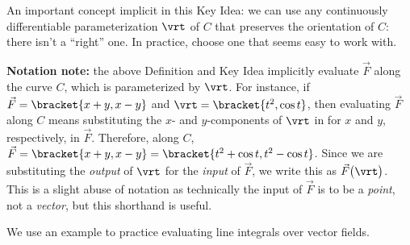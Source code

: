 An important concept implicit in this Key Idea: we can use any continuously differentiable parameterization $\vrt$ of $C$ that preserves the orientation of $C$: there isn't a ``right'' one. In practice, choose one that seems easy to work with. 

\textbf{Notation note:} the above Definition and Key Idea implicitly evaluate $\vec F$ along the curve $C$, which is parameterized by $\vrt$. For instance, if $\vec F =\bracket{x+y,x-y}$ and $\vrt =\bracket{t^2,\cos t}$, then evaluating $\vec F$ along $C$ means substituting the $x$- and $y$-components of $\vrt$ in for $x$ and $y$, respectively, in $\vec F$. Therefore, along $C$, $\vec F =\bracket{x+y,x-y}=\bracket{t^2+\cos t,t^2-\cos t}$. Since we are substituting the \emph{output} of $\vrt$ for the \emph{input} of $\vec F$, we write this as $\vec F\bigl(\vrt\bigr)$. This is a slight abuse of notation as technically the input of $\vec F$ is to be a \emph{point}, not a \emph{vector}, but this shorthand is useful.

We use an example to practice evaluating line integrals over vector fields.

